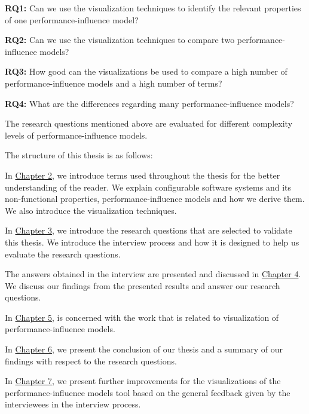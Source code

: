\textbf{RQ1:} Can we use the visualization techniques to identify the relevant properties of one performance-influence model?

\textbf{RQ2:} Can we use the visualization techniques to compare two performance-influence models?

\textbf{RQ3:} How good can the visualizations be used to compare a high number of performance-influence models and a high number of terms?

\textbf{RQ4:} What are the differences regarding many performance-influence models?

The research questions mentioned above are evaluated for different complexity levels of performance-influence models.

The structure of this thesis is as follows:

In \hyperref[background]{Chapter 2}, we introduce terms used throughout the thesis for the better understanding of the reader. We explain configurable software systems and its non-functional properties, performance-influence models and how we derive them. We also introduce the visualization techniques.

In \hyperref[methodology]{Chapter 3}, we introduce the research questions that are selected to validate this thesis. We introduce the interview process and how it is designed to help us evaluate the research questions. 

The answers obtained in the interview are presented and discussed in \hyperref[evaluation]{Chapter 4}. We discuss our findings from the presented results and answer our research questions.

In \hyperref[relatedwork]{Chapter 5}, is concerned with the work that is related to visualization of performance-influence models.

In \hyperref[conclusion]{Chapter 6}, we present the conclusion of our thesis and a summary of our findings with respect to the research questions.

In \hyperref[futurework]{Chapter 7}, we present further improvements for the visualizations of the performance-influence models tool based on the general feedback given by the interviewees in the interview process.



